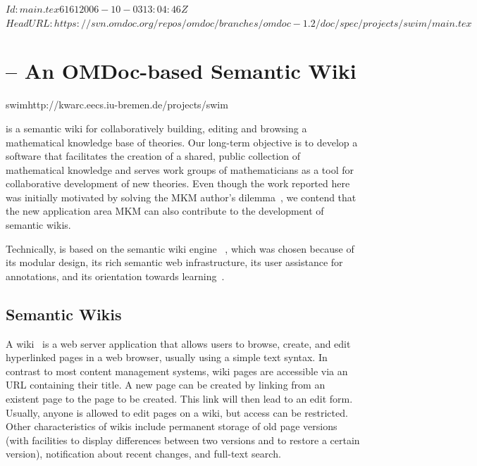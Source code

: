 \svnInfo $Id: main.tex 6161 2006-10-03 13:04:46Z  $
\svnKeyword $HeadURL: https://svn.omdoc.org/repos/omdoc/branches/omdoc-1.2/doc/spec/projects/swim/main.tex $

\section{{\swim} -- An OMDoc-based Semantic Wiki}
\begin{project}{swim}{http://kwarc.eecs.iu-bremen.de/projects/swim}
\end{project}

{\swim} is a semantic wiki for collaboratively building, editing and browsing a
mathematical knowledge base of {\omdoc} theories. Our long-term objective is to develop a
software that facilitates the creation of a shared, public collection of mathematical
knowledge and serves work groups of mathematicians as a tool for collaborative development
of new theories.  Even though the work reported here was initially motivated by solving
the MKM author's dilemma~\cite{KohKoh:cdad04}, we contend that the new application area
MKM can also contribute to the development of semantic wikis.

Technically, {\swim} is based on the semantic wiki engine
~\cite{schaffert06:ikewiki}, which was chosen because of its
modular design, its rich semantic web infrastructure, its user assistance for
annotations, and its orientation towards
learning~\cite{schaffert06:learning-with-semantic-wikis}.

\subsection{Semantic Wikis}

A wiki~\cite{LeuCun01:wikiway} is a web server
application that allows users to browse, create, and edit hyperlinked pages in a web
browser, usually using a simple text syntax.  In contrast to most content management
systems, wiki pages are accessible via an URL containing their title.  A new page can be
created by linking from an existent page to the page to be created.  This link will then
lead to an edit form.  Usually, anyone is allowed to edit pages on a wiki, but access can
be restricted.  Other characteristics of wikis include permanent storage of old page
versions (with facilities to display differences between two versions and to restore a
certain version), notification about recent changes, and full-text search.

